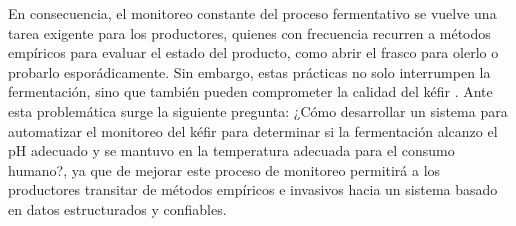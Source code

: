 En consecuencia, el monitoreo constante del proceso fermentativo se vuelve una
tarea exigente para los productores, quienes con frecuencia recurren a métodos
empíricos para evaluar el estado del producto, como abrir el frasco para olerlo o
probarlo esporádicamente. Sin embargo, estas prácticas no solo interrumpen la
fermentación, sino que también pueden comprometer la calidad del kéfir \cite{CuevasManilla1997}.\newline
Ante esta problemática surge la siguiente pregunta: ¿Cómo desarrollar un sistema
para automatizar el monitoreo del kéfir para determinar si la fermentación alcanzo
el pH adecuado y se mantuvo en la temperatura adecuada para el consumo
humano?, ya que de mejorar este proceso de monitoreo permitirá a los productores
transitar de métodos empíricos e invasivos hacia un sistema basado en datos
estructurados y confiables.